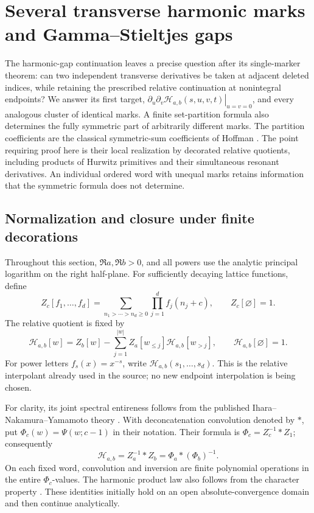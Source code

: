 
\section{Several transverse harmonic marks and Gamma--Stieltjes gaps}
\label{gm:section}

The harmonic-gap continuation \cite{gm:gaps-source} leaves a precise
question after its single-marker theorem: can two independent transverse
derivatives be taken at adjacent deleted indices, while retaining the
prescribed relative continuation at nonintegral endpoints?  We answer its
first target,
\(\left.\partial_u\partial_v\mathcal H_{a,b}(s,u,v,t)\right|_{u=v=0}\),
and every analogous cluster of identical marks.  A finite set-partition
formula also determines the fully symmetric part of arbitrarily different
marks.  The partition coefficients are the classical symmetric-sum
coefficients of Hoffman \cite{gm:Hoffman1992,gm:Hoffman2018}.  The point
requiring proof here is their local realization by decorated relative
quotients, including products of Hurwitz primitives and their simultaneous
resonant derivatives.  An individual ordered word with unequal marks
retains information that the symmetric formula does not determine.

\subsection{Normalization and closure under finite decorations}

Throughout this section, \(\Re a,\Re b>0\), and all powers use the
analytic principal logarithm on the right half-plane.  For sufficiently
decaying lattice functions, define
\[
 Z_c[f_1,\ldots,f_d]
 =\sum_{n_1>\cdots>n_d\ge0}\prod_{j=1}^df_j(n_j+c),
 \qquad Z_c[\varnothing]=1.
\]
The relative quotient is fixed by
\begin{equation}\label{gm:relative}
 \mathcal H_{a,b}[w]
 =Z_b[w]-\sum_{j=1}^{|w|}Z_a[w_{\le j}]
                                  \mathcal H_{a,b}[w_{>j}],
 \qquad \mathcal H_{a,b}[\varnothing]=1.
\end{equation}
For power letters \(f_s(x)=x^{-s}\), write
\(\mathcal H_{a,b}(s_1,\ldots,s_d)\).  This is the relative
interpolant already used in the source; no new endpoint interpolation is
being chosen.

For clarity, its joint spectral entireness follows from the published
Ihara--Nakamura--Yamamoto theory \cite[Corollary~4.2 and
Proposition~5.3]{gm:INY}.  With deconcatenation convolution denoted by
\(*\), put \(\Phi_c(w)=\Psi(w;c-1)\) in their notation.  Their
formula is \(\Phi_c=Z_c^{-1}*Z_1\); consequently
\[
 \mathcal H_{a,b}=Z_a^{-1}*Z_b=\Phi_a*(\Phi_b)^{-1}.
\]
On each fixed word, convolution and inversion are finite polynomial
operations in the entire \(\Phi_c\)-values.  The harmonic product law
also follows from the character property
\cite[Theorem~5.2]{gm:INY}.  These identities initially hold on an open
absolute-convergence domain and then continue analytically.

